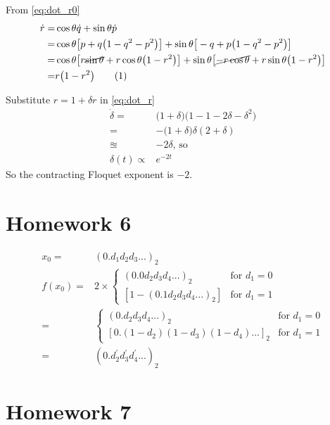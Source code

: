 \documentclass[]{article}
\newcommand\numberthis{\addtocounter{equation}{1}\tag{\theequation}}
\begin{document}
From \eqref{eq:dot_r0}
\begin{align*}
	\dot{r} =&	\cos{\theta} \dot{q} + \sin{\theta} \dot{p}\\
	=& 	\cos{\theta} \big[p + q\big(1-q^2-p^2\big)\big] + \sin{\theta} \big[-q + p\big(1-q^2-p^2\big)\big]\\
	=& 	\cos{\theta} \big[r \cancel{\sin{\theta}} + r \cos{\theta}\big(1-r^2\big)\big] + \sin{\theta} \big[\cancel{-r \cos{\theta}} + r \sin{\theta}\big(1-r^2\big)\big]\\
	=& r \big(1-r^2\big) \numberthis \label{eq:dot_r}
\end{align*}

Substitute $r=1+\delta r$ in \eqref{eq:dot_r}
\begin{align*}
	\dot{\delta} =& \big(1+\delta\big)\big(1 -1 -2 \delta - \delta^2\big)\\
	=& - \big(1+\delta\big) \delta (2 + \delta)\\
	\approxeq & - 2 \delta \text{, so}\\
	\delta(t) \propto & e^{-2 t}
\end{align*}
So the contracting Floquet exponent is $-2$.





\section{Homework 6}

\begin{align*}
	x_0 =& (0.d_1 d_2 d_3 ...)_2\\
	f(x_0) =& 2 \times \begin{cases}
		(0.0 d_2 d_3 d_4...)_2 & \text{for } d_1 = 0\\
		[1- (0.1 d_2 d_3 d_4...)_2] & \text{for } d_1 = 1
	\end{cases}\\
		=& \begin{cases}
			(0.d_2 d_3 d_4...)_2 & \text{for } d_1 = 0\\
			[0.(1-d_2) (1-d_3) (1-d_4)...]_2 & \text{for } d_1 = 1
		\end{cases}\\
	=& (0.d^\prime_2 d^\prime_3 d^\prime_4 ...)_2
\end{align*}
\section{Homework 7}
\end{document}
